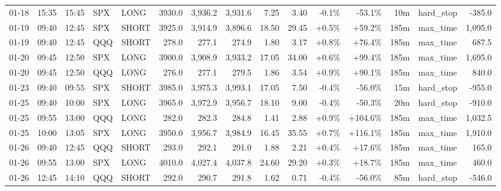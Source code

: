 \documentclass[11pt,a4paper,twoside]{article}
\begin{document}
\begin{landscape}
\begin{center}
\begin{longtable}{>{\color{txtmain}}l l l l l r r r r r r r r >{\color{txtmain}}l r}
01-18 & 15:35 & 15:45 & SPX & LONG & 3930.0 & 3,936.2 & 3,931.6 & 7.25 & 3.40 & \textcolor{lossred}{-0.1\%} & \textcolor{lossred}{-53.1\%} & 10m & hard\_stop & \textcolor{lossred}{-385.0} \\
01-19 & 09:40 & 12:45 & SPX & SHORT & 3925.0 & 3,914.9 & 3,896.6 & 18.50 & 29.45 & \textcolor{wingreen}{+0.5\%} & \textcolor{wingreen}{+59.2\%} & 185m & max\_time & \textcolor{wingreen}{1,095.0} \\
01-19 & 09:40 & 12:45 & QQQ & SHORT & 278.0 & 277.1 & 274.9 & 1.80 & 3.17 & \textcolor{wingreen}{+0.8\%} & \textcolor{wingreen}{+76.4\%} & 185m & max\_time & \textcolor{wingreen}{687.5} \\
01-20 & 09:45 & 12:50 & SPX & LONG & 3900.0 & 3,908.9 & 3,933.2 & 17.05 & 34.00 & \textcolor{wingreen}{+0.6\%} & \textcolor{wingreen}{+99.4\%} & 185m & max\_time & \textcolor{wingreen}{1,695.0} \\
01-20 & 09:45 & 12:50 & QQQ & LONG & 276.0 & 277.1 & 279.5 & 1.86 & 3.54 & \textcolor{wingreen}{+0.9\%} & \textcolor{wingreen}{+90.1\%} & 185m & max\_time & \textcolor{wingreen}{840.0} \\
01-23 & 09:40 & 09:55 & SPX & SHORT & 3985.0 & 3,975.3 & 3,993.1 & 17.05 & 7.50 & \textcolor{lossred}{-0.4\%} & \textcolor{lossred}{-56.0\%} & 15m & hard\_stop & \textcolor{lossred}{-955.0} \\
01-25 & 09:40 & 10:00 & SPX & LONG & 3965.0 & 3,972.9 & 3,956.7 & 18.10 & 9.00 & \textcolor{lossred}{-0.4\%} & \textcolor{lossred}{-50.3\%} & 20m & hard\_stop & \textcolor{lossred}{-910.0} \\
01-25 & 09:55 & 13:00 & QQQ & LONG & 282.0 & 282.3 & 284.8 & 1.41 & 2.88 & \textcolor{wingreen}{+0.9\%} & \textcolor{wingreen}{+104.6\%} & 185m & max\_time & \textcolor{wingreen}{1,032.5} \\
01-25 & 10:00 & 13:05 & SPX & LONG & 3950.0 & 3,956.7 & 3,984.9 & 16.45 & 35.55 & \textcolor{wingreen}{+0.7\%} & \textcolor{wingreen}{+116.1\%} & 185m & max\_time & \textcolor{wingreen}{1,910.0} \\
01-26 & 09:40 & 12:45 & QQQ & SHORT & 293.0 & 292.1 & 291.0 & 1.88 & 2.21 & \textcolor{wingreen}{+0.4\%} & \textcolor{wingreen}{+17.6\%} & 185m & max\_time & \textcolor{wingreen}{165.0} \\
01-26 & 09:55 & 13:00 & SPX & LONG & 4010.0 & 4,027.4 & 4,037.8 & 24.60 & 29.20 & \textcolor{wingreen}{+0.3\%} & \textcolor{wingreen}{+18.7\%} & 185m & max\_time & \textcolor{wingreen}{460.0} \\
01-26 & 12:45 & 14:10 & QQQ & SHORT & 292.0 & 290.7 & 291.8 & 1.62 & 0.71 & \textcolor{lossred}{-0.4\%} & \textcolor{lossred}{-56.0\%} & 85m & hard\_stop & \textcolor{lossred}{-546.0} \\

\end{longtable}
\end{center}
\end{landscape}
\end{document}
